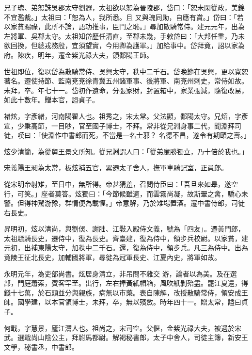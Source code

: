 \begin{pinyinscope}
 兄子瑰、弟恕誅吳郡太守劉遐，太祖欲以恕為晉陵郡，岱曰：「恕未閑從政，美錦不宜濫裁。」太祖曰：「恕為人，我所悉。且
 又與瑰同勛，自應有賞。」岱曰：「若以家貧賜祿，此所不論，語功推事，臣門之恥。」尋加散騎常侍。建元元年，出為左將軍、吳郡太守。太祖知岱歷任清直，至郡未幾，手敕岱曰：「大邦任重，乃未欲回換，但總戎務殷，宜須望實，今用卿為護軍。」加給事中。岱拜竟，詔以家為府。陳疾，明年，遷金紫光祿大夫，領鄱陽王師。



 世祖即位，復以岱為散騎常侍、吳興太守，秩中二千石。岱晚節在吳興，更以寬恕著名。遷使持節、監南兗兗徐青冀五州諸軍事、後將軍、南兗州刺史，常侍如故。未拜，卒。年七十一。岱初作遺命，分張家財，封置箱中，家業張減，隨復改易，如此十數年。贈本官，謚貞子。



 褚炫，字彥緒，河南陽翟人也。祖秀之，宋太常。父法顯，鄱陽太守。兄炤，字彥宣，少秉高節，一目眇，官至國子博士，不拜。常非從兄淵身事二代，聞淵拜司徒，嘆曰：「使淵作中書郎而死，不當是一名士邪？
 名德不昌，遂令有期頤之壽。」



 炫少清簡，為從舅王景文所知。從兄淵謂人曰：「從弟廉勝獨立，乃十倍於我也。」



 宋義陽王昶為太常，板炫補五官，累遷太子舍人，撫軍車騎記室，正員郎。



 從宋明帝射雉，至日中，無所得。帝甚猜羞，召問侍臣曰：「吾旦來如皋，遂空行，可笑。」座者莫答。炫獨曰：「今節候雖適，而雲霧尚凝，故斯翬之禽，驕心未警。但得神駕游豫，群情便為載懽。」帝意解，乃於雉場置酒。遷中書侍郎，司徒右長史。



 昇明初，炫以清尚，與劉俁、謝朏、江斅入殿侍文義，號為「四友」。遷黃門郎，太祖驃騎長史，遷侍中，復為長史。齊臺建，復為侍中，領步兵校尉。以家貧，建元初，出補東陽太守，加秩中二千石。還，復為侍中，領步兵。凡三為侍中。出為竟陵王征北長史，加輔國將軍，尋徙為冠軍長史、江夏內史，將軍如故。



 永明元年，為吏部尚書。炫居身清立，非吊問不雜交
 游，論者以為美。及在選部，門庭蕭索，賓客罕至。出行，左右捧黃紙帽箱，風吹紙剝殆盡。罷江夏還，得錢十七萬，於石頭並分與親族，病無以市藥。表自陳解，改授散騎常侍，領安成王師。國學建，以本官領博士，未拜，卒，無以殯斂。時年四十一。贈太常，謚曰貞子。



 何戢，字慧景，廬江灊人也。祖尚之，宋司空。父偃，金紫光祿大夫，被遇於宋武。選戢尚山陰公主，拜駙馬都尉。解褐秘書郎，太子中舍人，司徒主簿，新安王文學，秘書丞，中書郎。




\end{pinyinscope}
